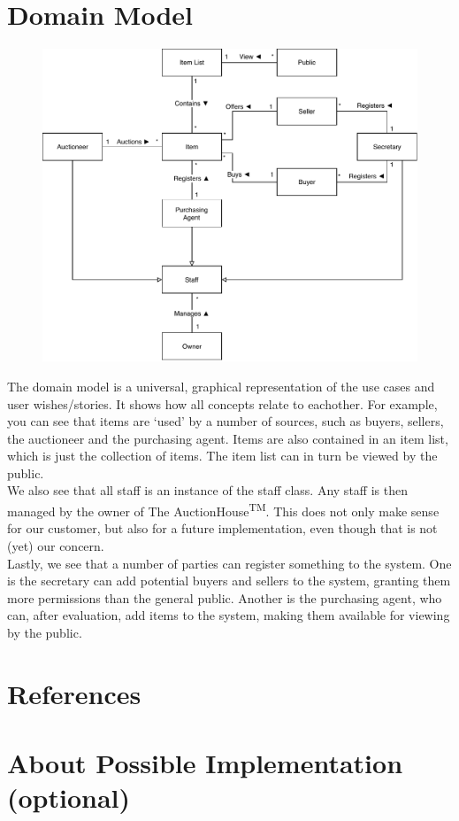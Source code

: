 \documentclass{article}
\begin{document}
\section*{Domain Model}
\begin{figure}[H]
	\centering
	\includegraphics[scale=.9]{domainmodel.pdf}
\end{figure}
The domain model is a universal, graphical representation of the use cases and user wishes/stories. It shows how all concepts relate to eachother. For example, you can see that items are `used' by a number of sources, such as buyers, sellers, the auctioneer and the purchasing agent. Items are also contained in an item list, which is just the collection of items. The item list can in turn be viewed by the public.\\
We also see that all staff is an instance of the staff class. Any staff is then managed by the owner of The AuctionHouse\textsuperscript{TM}. This does not only make sense for our customer, but also for a future implementation, even though that is not (yet) our concern.\\
Lastly, we see that a number of parties can register something to the system. One is the secretary can add potential buyers and sellers to the system, granting them more permissions than the general public. Another is the purchasing agent, who can, after evaluation, add items to the system, making them available for viewing by the public.
\section*{References}
\section*{About Possible Implementation (optional)}

\end{document}
